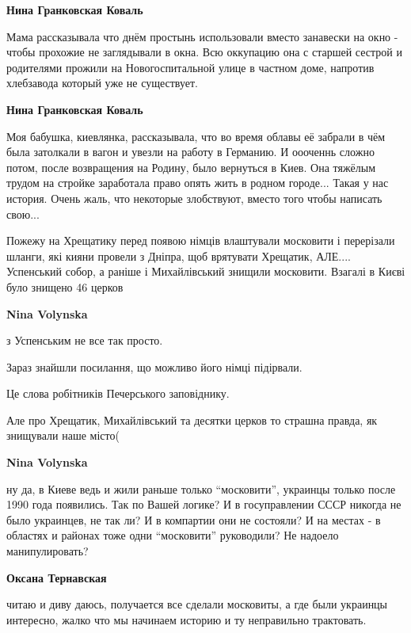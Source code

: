 \begin{itemize}
\begin{itemize} %
\textbf{Нина Гранковская Коваль} 

Мама рассказывала что днём простынь использовали вместо занавески на окно -
чтобы прохожие не заглядывали в окна. Всю оккупацию она с старшей сестрой и
родителями прожили на Новогоспитальной улице в частном доме, напротив
хлебзавода который уже не существует.

\textbf{Нина Гранковская Коваль} 

Моя бабушка, киевлянка, рассказывала, что во время облавы её забрали в чём была
затолкали в вагон и увезли на работу в Германию. И оооченнь сложно потом, после
возвращения на Родину, было вернуться в Киев. Она тяжёлым трудом на стройке
заработала право опять жить в родном городе... Такая у нас история. Очень жаль,
что некоторые злобствуют, вместо того чтобы написать свою...

\end{itemize} %


Пожежу на Хрещатику перед появою німців влаштували московити і перерізали
шланги, які кияни провели з Дніпра, щоб врятувати Хрещатик, АЛЕ.... Успенський
собор, а раніше і Михайлівський знищили московити. Взагалі в Києві було знищено
46 церков

\begin{itemize} %
\textbf{Nina Volynska} 

з Успенським не все так просто.

Зараз знайшли посилання, що можливо його німці підірвали.

Це слова робітників Печерського заповіднику.

Але про Хрещатик, Михайлівський та десятки церков то страшна правда, як
знищували наше місто(

\textbf{Nina Volynska} 

ну да, в Киеве ведь и жили раньше только \enquote{московити}, украинцы только после
1990 года появились. Так по Вашей логике? И в госуправлении СССР никогда не
было украинцев, не так ли? И в компартии они не состояли? И на местах - в
областях и районах тоже одни \enquote{московити} руководили? Не надоело манипулировать?

\begin{itemize} %
\textbf{Оксана Тернавская} 

читаю и диву даюсь, получается все сделали московиты, а где были украинцы
интересно, жалко что мы начинаем историю и ту неправильно трактовать.


\end{itemize}
\end{itemize}
\end{itemize}

